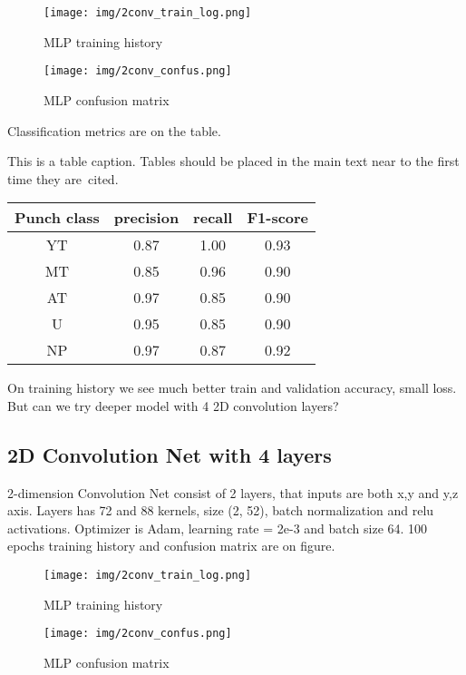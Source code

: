 \documentclass[sport,article,submit,moreauthors,pdftex]{Definitions/mdpi}
\begin{document}
\begin{figure}[H]
\texttt{[image: img/2conv\_train\_log.png]}
\caption{MLP training history}
\end{figure} 

\begin{figure}[H]
\texttt{[image: img/2conv\_confus.png]}
\caption{MLP confusion matrix}
\end{figure} 

Classification metrics are on the table.
\begin{specialtable}[H] 
\caption{This is a table caption. Tables should be placed in the main text near to the first time they are~cited.\label{tab1}}
\begin{tabular}{cccc}
\toprule
\textbf{Punch class}	&\textbf{precision}	& \textbf{recall}	& \textbf{F1-score}\\
\midrule
YT		& 0.87		& 1.00		& 0.93 \\
MT		& 0.85		& 0.96		& 0.90 \\
AT		& 0.97		& 0.85		& 0.90 \\
U		& 0.95		& 0.85		& 0.90 \\
NP		& 0.97		& 0.87		& 0.92 \\
\bottomrule
\end{tabular}
\end{specialtable}

On training history we see much better train and validation accuracy, small loss.
But can we try deeper model with 4 2D convolution layers?


\subsection{2D Convolution Net with 4 layers}

2-dimension Convolution Net consist of 2 layers, that inputs are both x,y and y,z axis. Layers has  72 and 88 kernels, size (2, 52), batch normalization and relu activations. 
Optimizer is Adam, learning rate = 2e-3 and batch size 64.
100 epochs training history and confusion matrix are on figure.

\begin{figure}[H]
\texttt{[image: img/2conv\_train\_log.png]}
\caption{MLP training history}
\end{figure} 

\begin{figure}[H]
\texttt{[image: img/2conv\_confus.png]}
\caption{MLP confusion matrix}
\end{figure} 
\end{document}
